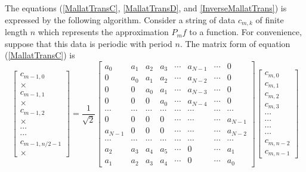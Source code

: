\documentclass{book}
\begin{document}
The equations (\ref{MallatTransC}, \ref{MallatTransD}, and
\ref{InverseMallatTrans}) is expressed by the following algorithm. Consider a
string of data $c_{m, k}$ of finite length $n$ which represents the
approximation $P_m f$ to a function. For convenience, suppose that this data
is periodic with period $n$. The matrix form of equation (\ref{MallatTransC})
is
\[ \left[\begin{array}{c}
     c_{m - 1, 0}\\
     \times\\
     c_{m - 1, 1}\\
     \times\\
     c_{m - 1, 2}\\
     \times\\
     \cdots\\
     \cdots\\
     c_{m - 1, n / 2 - 1}\\
     \times
   \end{array}\right] = \frac{1}{\sqrt{2}} \left[\begin{array}{cccccccc}
     a_0 & a_1 & a_2 & a_3 & \cdots & a_{N - 1} & \cdots & 0\\
     0 & a_0 & a_1 & a_2 & \cdots & a_{N - 2} & \cdots & 0\\
     0 & 0 & a_0 & a_1 & \cdots & a_{N - 3} & \cdots & 0\\
     0 & 0 & 0 & a_0 & \cdots & a_{N - 4} & \cdots & 0\\
     \cdots & \cdots & \cdots & \cdots & \cdots & \cdots & \cdots & \cdots\\
     0 & 0 & 0 & 0 & \cdots & \cdots & \cdots & a_{N - 1}\\
     a_{N - 1} & 0 & 0 & 0 & \cdots & \cdots & \cdots & a_{N - 2}\\
     \cdots & \cdots & \cdots & \cdots & \cdots & \cdots & \cdots & \cdots\\
     a_2 & a_3 & a_4 & a_5 & \cdots & 0 & \cdots & a_1\\
     a_1 & a_2 & a_3 & a_4 & \cdots & 0 & \cdots & a_0
   \end{array}\right] \left[\begin{array}{c}
     c_{m, 0}\\
     c_{m, 1}\\
     c_{m, 2}\\
     c_{m, 3}\\
     \cdots\\
     \cdots\\
     \cdots\\
     \cdots\\
     c_{m, n - 2}\\
     c_{m, n - 1}
   \end{array}\right] \]
\end{document}
